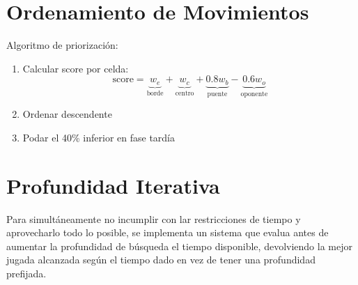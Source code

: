 \documentclass{article}
\begin{document}
\section{Ordenamiento de Movimientos}
Algoritmo de priorización:
\begin{enumerate}
    \item Calcular score por celda: 
    \begin{equation*}
        \text{score} = \underbrace{w_e}_{\text{borde}} + \underbrace{w_c}_{\text{centro}} + \underbrace{0.8w_b}_{\text{puente}} - \underbrace{0.6w_o}_{\text{oponente}}
    \end{equation*}
    \item Ordenar descendente
    \item Podar el 40\% inferior en fase tardía
\end{enumerate}

\section{Profundidad Iterativa}
Para simultáneamente no incumplir con lar restricciones de tiempo y aprovecharlo todo lo posible, se implementa un sistema que evalua antes de aumentar la profundidad de búsqueda el tiempo disponible, devolviendo la mejor jugada alcanzada según el tiempo dado en vez de tener una profundidad prefijada.
\end{document}
